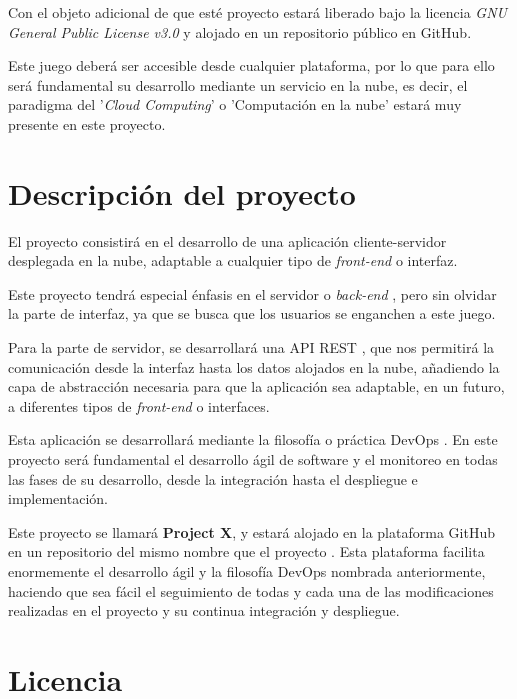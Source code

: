 Con el objeto adicional de que esté proyecto estará liberado bajo la licencia \textit{GNU General Public License v3.0} \cite{licenciaproyecto} y alojado en un repositorio público en GitHub.

Este juego deberá ser accesible desde cualquier plataforma, por lo que para ello será fundamental su desarrollo mediante un servicio en la nube, es decir, el paradigma del '\textit{Cloud Computing}' o 'Computación en la nube' \cite{nube1} estará muy presente en este proyecto.

\section{Descripción del proyecto}

El proyecto consistirá en el desarrollo de una aplicación cliente-servidor desplegada en la nube, adaptable a cualquier tipo de \textit{front-end} \cite{frontback} o interfaz.

Este proyecto tendrá especial énfasis en el servidor o \textit{back-end} \cite{frontback}, pero sin olvidar la parte de interfaz, ya que se busca que los usuarios se enganchen a este juego.

Para la parte de servidor, se desarrollará una API REST\cite{api1} \cite{api2}\cite{api3}, que nos permitirá la comunicación desde la interfaz hasta los datos alojados en la nube, añadiendo la capa de abstracción necesaria para que la aplicación sea adaptable, en un futuro, a diferentes tipos de \textit{front-end} o interfaces. 

Esta aplicación se desarrollará mediante la filosofía o práctica DevOps \cite{devops1} \cite{devops2} \cite{devops3} \cite{devops4}. En este proyecto será fundamental el desarrollo ágil de software y el monitoreo en todas las fases de su desarrollo, desde la integración hasta el despliegue e implementación.

Este proyecto se llamará \textbf{Project X}, y estará alojado en la plataforma GitHub en un repositorio del mismo nombre que el proyecto \cite{proyectogithub}. Esta plataforma facilita enormemente el desarrollo ágil y la filosofía DevOps nombrada anteriormente, haciendo que sea fácil el seguimiento de todas y cada una de las modificaciones realizadas en el proyecto y su continua integración y despliegue.

\section{Licencia}

